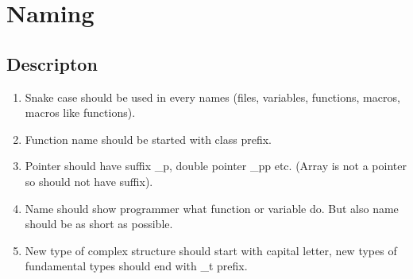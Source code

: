 \section{Naming}
\subsection{Descripton}
\begin{enumerate}
    \item Snake case should be used in every names (files, variables, functions, macros, macros like functions).
    \item Function name should be started with class prefix.
    \item Pointer should have suffix \_p, double pointer \_pp etc. (Array is not a pointer so should not have suffix).
    \item Name should show programmer what function or variable do. But also name should be as short as possible.
    \item New type of complex structure should start with capital letter, new types of fundamental types should end with \_t prefix.
\end{enumerate}

